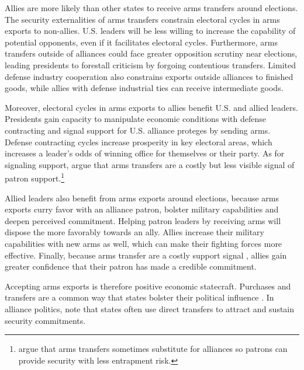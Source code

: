 \documentclass[12pt]{article}
\begin{document}
Allies are more likely than other states to receive arms transfers around elections.
The security externalities of arms transfers constrain electoral cycles in arms exports to non-allies. 
U.S. leaders will be less willing to increase the capability of potential opponents, even if it facilitates electoral cycles.
Furthermore, arms transfers outside of alliances could face greater opposition scrutiny near elections, leading presidents to forestall criticism by forgoing contentious transfers.
Limited defense industry cooperation also constrains exports outside alliances to finished goods, while allies with defense industrial ties can receive intermediate goods.


Moreover, electoral cycles in arms exports to allies benefit U.S. and allied leaders.
Presidents gain capacity to manipulate economic conditions with defense contracting and signal support for U.S. alliance proteges by sending arms.
Defense contracting cycles increase prosperity in key electoral areas, which increases a leader's odds of winning office for themselves or their party. 
As for signaling support, \citet{McManusYarhi-Milo2017} argue that arms transfers are a costly but less visible signal of patron support.\footnote{\citet{Yarhi-Miloetal2016} argue that arms transfers sometimes substitute for alliances so patrons can provide security with less entrapment risk.}


Allied leaders also benefit from arms exports around elections, because arms exports curry favor with an alliance patron, bolster military capabilities and deepen perceived commitment.
Helping patron leaders by receiving arms will dispose the more favorably towards an ally. 
Allies increase their military capabilities with new arms as well, which can make their fighting forces more effective. 
Finally, because arms transfer are a costly support signal \citep{McManusYarhi-Milo2017}, allies gain greater confidence that their patron has made a credible commitment. 


Accepting arms exports is therefore positive economic statecraft. 
Purchases and transfers are a common way that states bolster their political influence \citep[pg. 42-3]{Baldwin2020}.
In alliance politics, \citet[pg. 184-5]{IkenberryGrieco2003} note that states often use direct transfers to attract and sustain security commitments.  
\end{document}
